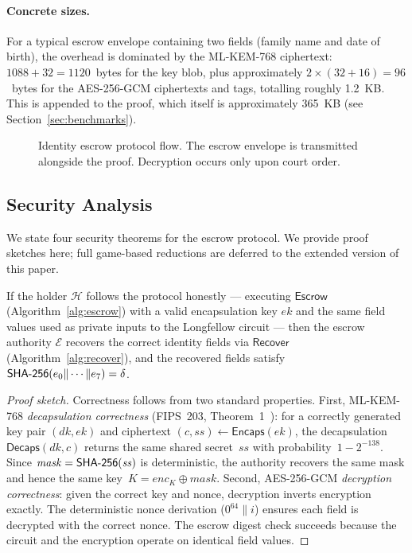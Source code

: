 \paragraph{Concrete sizes.}
For a typical escrow envelope containing two fields (family name and date of birth), the overhead is dominated by the ML-KEM-768 ciphertext: $1088 + 32 = 1120$~bytes for the key blob, plus approximately $2 \times (32 + 16) = 96$~bytes for the AES-256-GCM ciphertexts and tags, totalling roughly 1.2~KB.  This is appended to the proof, which itself is approximately 365~KB (see Section~\ref{sec:benchmarks}).

\begin{figure}[t]
\centering

\caption{Identity escrow protocol flow. The escrow envelope is transmitted alongside the proof. Decryption occurs only upon court order.}
\label{fig:escrow-protocol}
\end{figure}

\subsection{Security Analysis}\label{sec:escrow-security}

We state four security theorems for the escrow protocol.  We provide proof sketches here; full game-based reductions are deferred to the extended version of this paper.

\begin{theorem}\label{thm:correctness}
  If the holder $\mathcal{H}$ follows the protocol honestly --- executing
  $\mathsf{Escrow}$ (Algorithm~\ref{alg:escrow}) with a valid
  encapsulation key $\mathit{ek}$ and the same field values used as
  private inputs to the Longfellow circuit --- then the escrow authority
  $\mathcal{E}$ recovers the correct identity fields via
  $\mathsf{Recover}$ (Algorithm~\ref{alg:recover}), and the recovered
  fields satisfy $\mathsf{SHA\textnormal{-}256}(e_0 \| \cdots \| e_7) = \delta$.
\end{theorem}

\begin{proof}[Proof sketch]
  Correctness follows from two standard properties.
  First, ML-KEM-768 \emph{decapsulation correctness} (FIPS~203, Theorem~1~\cite{fips203}):
  for a correctly generated key pair $(\mathit{dk}, \mathit{ek})$ and
  ciphertext $(c, \mathit{ss}) \gets \mathsf{Encaps}(\mathit{ek})$,
  the decapsulation $\mathsf{Decaps}(\mathit{dk}, c)$ returns
  the same shared secret~$\mathit{ss}$ with probability~$1 - 2^{-138}$.
  Since $\mathit{mask} = \mathsf{SHA\textnormal{-}256}(\mathit{ss})$ is deterministic,
  the authority recovers the same mask and hence the same
  key~$K = \mathit{enc}_K \oplus \mathit{mask}$.
  Second, AES-256-GCM \emph{decryption correctness}: given the correct
  key and nonce, decryption inverts encryption exactly.
  The deterministic nonce derivation ($0^{64} \| i$) ensures each
  field is decrypted with the correct nonce.
  The escrow digest check succeeds because the circuit and the
  encryption operate on identical field values.
\end{proof}

